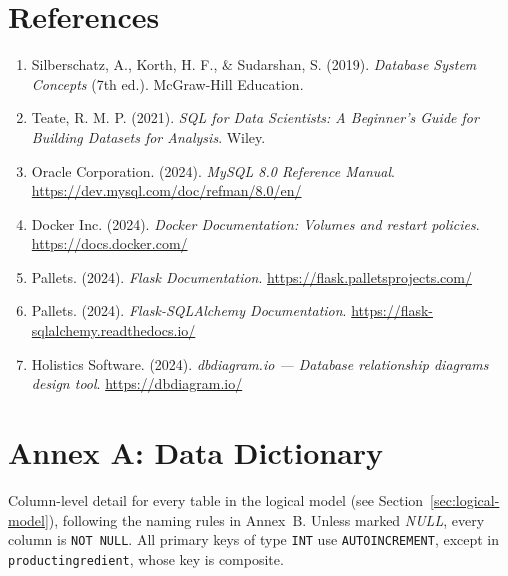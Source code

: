 \documentclass[11pt]{article}
\renewcommand{\_}{\oldunderscore\allowbreak}
\begin{document}
\section{References}

\begin{enumerate}[leftmargin=1.4em, itemsep=0.5em]
  \item Silberschatz, A., Korth, H. F., \& Sudarshan, S. (2019). \textit{Database System Concepts} (7th ed.). McGraw-Hill Education.
  \item Teate, R. M. P. (2021). \textit{SQL for Data Scientists: A Beginner's Guide for Building Datasets for Analysis}. Wiley.
  \item Oracle Corporation. (2024). \textit{MySQL 8.0 Reference Manual}. \url{https://dev.mysql.com/doc/refman/8.0/en/}
  \item Docker Inc. (2024). \textit{Docker Documentation: Volumes and restart policies}. \url{https://docs.docker.com/}
  \item Pallets. (2024). \textit{Flask Documentation}. \url{https://flask.palletsprojects.com/}
  \item Pallets. (2024). \textit{Flask-SQLAlchemy Documentation}. \url{https://flask-sqlalchemy.readthedocs.io/}
  \item Holistics Software. (2024). \textit{dbdiagram.io --- Database relationship diagrams design tool}. \url{https://dbdiagram.io/}
\end{enumerate}

\clearpage
\section*{Annex A: Data Dictionary}

Column-level detail for every table in the logical model (see Section~\ref{sec:logical-model}), following the naming rules in Annex~B. Unless marked \textit{NULL}, every column is \texttt{NOT NULL}. All primary keys of type \texttt{INT} use \texttt{AUTO\_INCREMENT}, except in \texttt{product\_ingredient}, whose key is composite.
\end{document}
